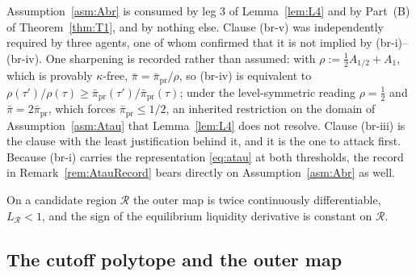 Assumption~\ref{asm:Abr} is consumed by leg 3 of Lemma~\ref{lem:L4} and by Part~(B) of
Theorem~\ref{thm:T1}, and by nothing else. Clause (br-v) was independently required by three agents,
one of whom confirmed that it is not implied by (br-i)--(br-iv). One sharpening is recorded rather
than assumed: with $\rho := \tfrac12 A_{1/2} + A_1$, which is provably $\kappa$-free,
$\bar\pi = \bar\pi_{\mathrm{pr}}/\rho$, so (br-iv) is equivalent to
$\rho(\tau')/\rho(\tau) \ge \bar\pi_{\mathrm{pr}}(\tau')/\bar\pi_{\mathrm{pr}}(\tau)$; under the
level-symmetric reading $\rho = \tfrac12$ and $\bar\pi = 2\bar\pi_{\mathrm{pr}}$, which forces
$\bar\pi_{\mathrm{pr}} \le 1/2$, an inherited restriction on the domain of
Assumption~\ref{asm:Atau} that Lemma~\ref{lem:L4} does not resolve. Clause (br-iii) is the clause
with the least justification behind it, and it is the one to attack first. Because (br-i) carries the
representation \eqref{eq:atau} at both thresholds, the record in Remark~\ref{rem:AtauRecord} bears
directly on Assumption~\ref{asm:Abr} as well.

\begin{assumption}
\label{asm:AGE}
On a candidate region $\mathcal R$ the outer map is twice continuously differentiable,
$L_{\mathcal R} < 1$, and the sign of the equilibrium liquidity derivative is constant on
$\mathcal R$.
\end{assumption}

\subsection{The cutoff polytope and the outer map}
\label{sec:polytope}


